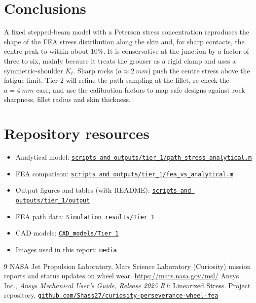 \documentclass[11pt,a4paper]{article}
\newcommand{\repo}{https://github.com/Shass27/curiosity-perseverance-wheel-fea}
\newcommand{\tree}{\repo/tree/main}
\newcommand{\blob}{\repo/blob/main}
\begin{document}
\section{Conclusions}

A fixed stepped-beam model with a Peterson stress concentration reproduces the shape of the FEA stress distribution along the skin and, for sharp contacts, the centre peak to within about 10\%. It is conservative at the junction by a factor of three to six, mainly because it treats the grouser as a rigid clamp and uses a symmetric-shoulder $K_t$. Sharp rocks ($a \approx \SI{2}{mm}$) push the centre stress above the fatigue limit. Tier 2 will refine the path sampling at the fillet, re-check the $a = \SI{4}{mm}$ case, and use the calibration factors to map safe designs against rock sharpness, fillet radius and skin thickness.

\section*{Repository resources}
\begin{itemize}\setlength\itemsep{0pt}
  \item Analytical model: \href{\blob/scripts\%20and\%20outputs/tier_1/path_stress_analytical.m}{\texttt{scripts and outputs/tier\_1/path\_stress\_analytical.m}}
  \item FEA comparison: \href{\blob/scripts\%20and\%20outputs/tier_1/fea_vs_analytical.m}{\texttt{scripts and outputs/tier\_1/fea\_vs\_analytical.m}}
  \item Output figures and tables (with README): \href{\tree/scripts\%20and\%20outputs/tier_1/output}{\texttt{scripts and outputs/tier\_1/output}}
  \item FEA path data: \href{\tree/Simulation\%20results/Tier\%201}{\texttt{Simulation results/Tier 1}}
  \item CAD models: \href{\tree/CAD_models/Tier\%201}{\texttt{CAD\_models/Tier 1}}
  \item Images used in this report: \href{\tree/media}{\texttt{media}}
\end{itemize}

\begin{thebibliography}{9}
   NASA Jet Propulsion Laboratory, Mars Science Laboratory (Curiosity) mission reports and status updates on wheel wear. \url{https://mars.nasa.gov/msl/}
   Ansys Inc., \emph{Ansys Mechanical User's Guide, Release 2025 R1}: Linearized Stress.
   Project repository, \href{\repo}{\texttt{github.com/Shass27/curiosity-perseverance-wheel-fea}}
\end{thebibliography}
\end{document}
